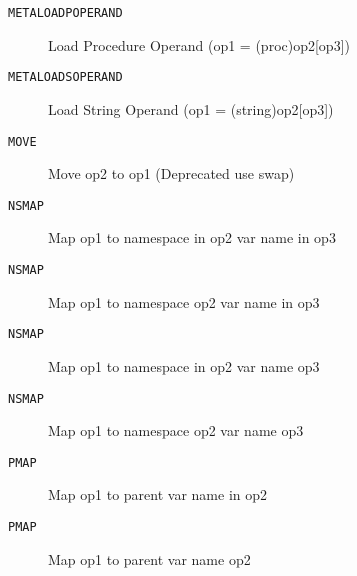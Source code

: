 \begin{description}
\item[\texttt{METALOADPOPERAND}]        Load Procedure Operand (op1 = (proc)op2[op3])\\

\end{description}
\begin{description}
\item[\texttt{METALOADSOPERAND}]        Load String Operand (op1 = (string)op2[op3])\\

\end{description}
\begin{description}
\item[\texttt{MOVE}]  Move op2 to op1 (Deprecated use swap)\\

\end{description}
\begin{description}
\item[\texttt{NSMAP}]  Map op1 to namespace in op2 var name in op3\\

\end{description}
\begin{description}
\item[\texttt{NSMAP}]  Map op1 to namespace op2 var name in op3\\

\end{description}
\begin{description}
\item[\texttt{NSMAP}]  Map op1 to namespace in op2 var name op3\\

\end{description}
\begin{description}
\item[\texttt{NSMAP}]  Map op1 to namespace op2 var name op3\\

\end{description}
\begin{description}
\item[\texttt{PMAP}]  Map op1 to parent var name in op2\\

\end{description}
\begin{description}
\item[\texttt{PMAP}]  Map op1 to parent var name op2\\

\end{description}
